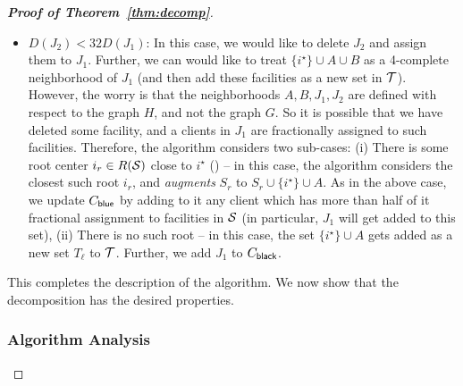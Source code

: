 \begin{proof}[{\bf Proof of Theorem~\ref{thm:decomp}}]
\begin{itemize}
\item $D(J_2) < 32 D(J_1)$: In this case, we would like to delete $J_2$ and assign them to $J_1$. Further, we can would like to treat $\{i^\star\} \cup A \cup B$ as a 4-complete neighborhood of $J_1$ (and then add these facilities as a new set in ${\cal T}$). However, the worry is that the neighborhoods $A,B, J_1, J_2$ are defined with respect to the graph
    $H$, and not the graph $G$. So it is possible that we have deleted some facility, and a clients in $J_1$ are fractionally assigned to such facilities. Therefore, the algorithm considers two sub-cases: (i) There is some root center  $i_r \in R({\cal S})$ close to $i^\star$ () -- in this
    case, the algorithm considers the closest such root $i_r$, and {\em augments} $S_r$ to $S_r \cup \{i^\star\} \cup A$. As in the above case,
    we update $C_{\mathsf{blue}}$ by adding to it any client which has more than half of it fractional assignment to facilities in ${\cal S}$ (in particular, $J_1$ will
    get added to this set), (ii) There is no such root -- in this case, the set $\{i^\star\} \cup A$ gets added as a new set $T_\ell$ to ${\cal T}$. Further,
    we add $J_1$ to $C_{\mathsf{black}}$.
    \end{itemize}

This completes the description of the algorithm. We now show that the decomposition has the desired properties.

\subsubsection{Algorithm Analysis}


\end{proof}
